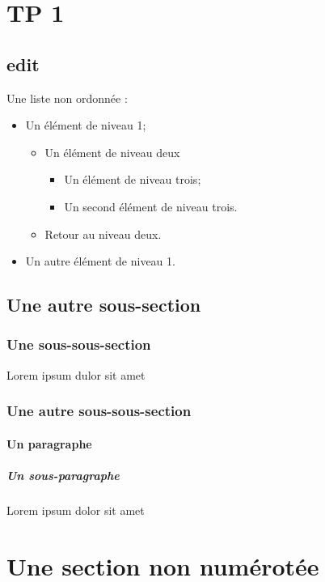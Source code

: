 \section{TP 1}

\subsection{edit}

Une liste non ordonnée :
\begin{itemize}
    \item Un élément de niveau 1;
    \begin{itemize}
        \item Un élément de niveau deux
        \begin{itemize}
            \item Un élément de niveau trois;
            \item Un second élément de niveau trois.
        \end{itemize}
        \item Retour au niveau deux.
    \end{itemize}
    \item Un autre élément de niveau 1.
\end{itemize}

\subsection{Une autre sous-section}
\subsubsection{Une sous-sous-section}
Lorem ipsum dulor sit amet
\subsubsection{Une autre sous-sous-section}
\paragraph{Un paragraphe}
\subparagraph{Un sous-paragraphe}
Lorem ipsum dolor sit amet

\section*{Une section non numérotée}

